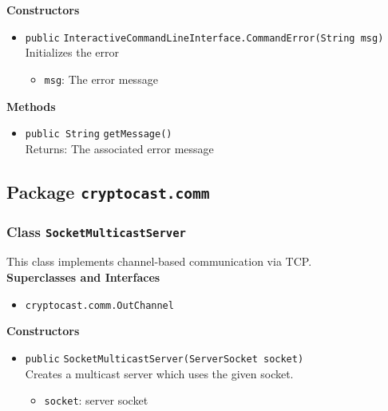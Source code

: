 \textbf{Constructors}
\begin{itemize}
\item \lstinline|public| \lstinline|InteractiveCommandLineInterface.CommandError|\lstinline|(String msg)|\\
Initializes the error
\begin{itemize}
\item \lstinline|msg|: The error message
\end{itemize}



\end{itemize}


\textbf{Methods}
\begin{itemize}
\item \lstinline|public String| \lstinline|getMessage|\lstinline|()|\\
Returns: The associated error message



\end{itemize}


\subsection{Package \lstinline!cryptocast.comm!}
\subsubsection{Class \lstinline|SocketMulticastServer|}
This class implements channel-based communication via TCP. \\


\textbf{Superclasses and Interfaces}
\begin{itemize}
\item \lstinline|cryptocast.comm.OutChannel|
\end{itemize}



\textbf{Constructors}
\begin{itemize}
\item \lstinline|public| \lstinline|SocketMulticastServer|\lstinline|(ServerSocket socket)|\\
Creates a multicast server which uses the given socket.
\begin{itemize}
\item \lstinline|socket|: server socket
\end{itemize}



\end{itemize}


